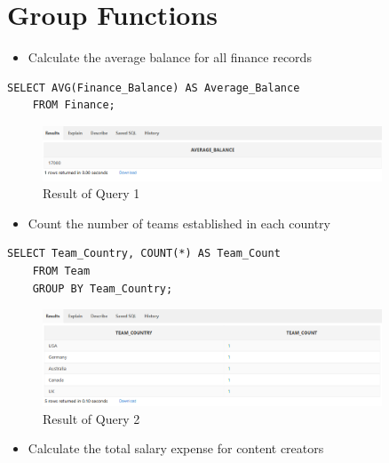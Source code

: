 \section{Group Functions}
\hrulefill

\begin{itemize}
    \item Calculate the average balance for all finance records
\end{itemize}

\begin{lstlisting}[caption={ Query 1},label={lst:q-1}]
    SELECT AVG(Finance_Balance) AS Average_Balance
    FROM Finance;
\end{lstlisting}
\begin{figure}[H]
    \centering
    \includegraphics[width=0.9\textwidth]{images/dml/GroupFun/Q1.png}
    \caption{Result of Query 1}
    \label{fig:Result of Query 1}
\end{figure}
\begin{itemize}
    \item Count the number of teams established in each country
\end{itemize}

\begin{lstlisting}[caption={ Query 2},label={lst:q-2}]
    SELECT Team_Country, COUNT(*) AS Team_Count
    FROM Team
    GROUP BY Team_Country;
\end{lstlisting}

\begin{figure}[H]
    \centering
    \includegraphics[width=0.9\textwidth]{images/dml/GroupFun/Q2.png}
    \caption{Result of Query 2}
    \label{fig:Result of Query 2}
\end{figure}

\begin{itemize}
    \item Calculate the total salary expense for content creators
\end{itemize}

